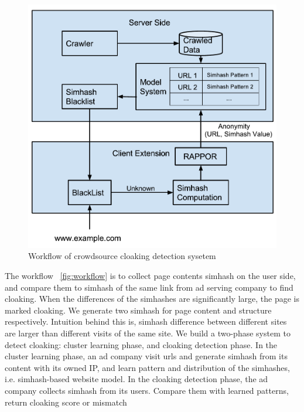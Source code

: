 \begin{figure}[t]
  \centering
  \includegraphics[width=.45\textwidth]{fig/crowdsourcing-cloaking-detection-system}
  \caption{Workflow of crowdsource cloaking detection sysetem}
  \label{fig:workflow}
\end{figure}


The workflow ~\autoref{fig:workflow} is to collect page contents simhash on the user side, and compare
them to simhash of the same link from ad serving company to find cloaking. When
the differences of the simhashes are significantly large, the page is marked
cloaking. We generate two simhash for page content and structure respectively.
Intuition behind this is, simhash difference between different sites are larger
than different visits of the same site. We build a two-phase system to detect
cloaking: cluster learning phase, and cloaking detection phase. In the cluster
learning phase, an ad company visit urls and generate simhash from its content
with its owned IP, and learn pattern and distribution of the simhashes, i.e.
simhash-based website model. In the cloaking detection phase, the ad company
collects simhash from its users. Compare them with learned patterns, return
cloaking score or mismatch

